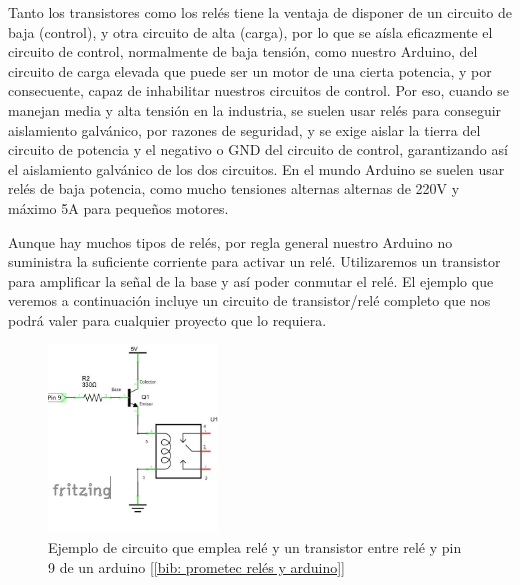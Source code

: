 \documentclass[12pt]{article}
\begin{document}
	\noindent Tanto los transistores como los relés tiene la ventaja de disponer de un circuito de baja (control), y otra circuito de alta (carga), por lo que se aísla eficazmente el circuito de control, normalmente de baja tensión, como nuestro Arduino, del circuito de carga elevada que puede ser un motor de una cierta potencia, y por consecuente, capaz de inhabilitar nuestros circuitos de control. Por eso, cuando se manejan media y alta tensión en la industria, se suelen usar relés para conseguir aislamiento galvánico, por razones de seguridad, y se exige aislar la tierra del circuito de potencia y el negativo o GND del circuito de control, garantizando así el aislamiento galvánico de los dos circuitos. En el mundo Arduino se suelen usar relés de baja potencia, como mucho tensiones alternas alternas de 220V y máximo 5A para pequeños motores.
	
	\noindent Aunque hay muchos tipos de relés, por regla general nuestro Arduino no suministra la suficiente corriente para activar un relé. Utilizaremos un transistor para amplificar la señal de la base y así poder conmutar el relé. El ejemplo que veremos a continuación incluye un circuito de transistor/relé completo que nos podrá valer para  cualquier proyecto que lo requiera.
	
	\begin{figure}[h]
		\begin{center}
			\includegraphics[width=0.4\textwidth]{img/rele_transistor.jpg}
			\caption{Ejemplo de circuito que emplea relé y un transistor entre relé y pin 9 de un arduino [\ref{bib: prometec relés y arduino}]}
			\label{Ejemplo rele con transistor}
		\end{center}
	\end{figure}
	
\end{document}
